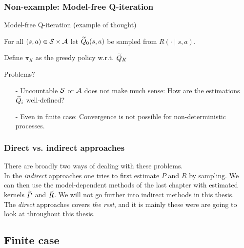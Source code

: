 \documentclass{beamer}[10]
\begin{document}
\begin{frame}[fragile]
  \frametitle{Non-example: Model-free Q-iteration}
  \begingroup
  \scriptsize
  \begin{block}{Model-free Q-iteration (example of thought)}
    \begin{algorithm}[H]
      For all $(s, a) \in \mathcal{S} \times \mathcal{A}$ let
      $\widetilde{Q}_0(s, a)$ be sampled from $R(\cdot \mid s, a)$.

      Define $\pi_K$ as the greedy policy w.r.t. $\widetilde{Q}_K$ \\
    \end{algorithm}
  \end{block}
  Problems?
  \begin{itemize}
    \item[-] Uncountable $\mathcal{S}$ or $\mathcal{A}$ does not make much sense:
      How are the estimations $\widetilde{Q}_i$ well-defined?
    \item[-] Even in finite case: Convergence is not possible for
      non-deterministic processes.
  \end{itemize}
  \endgroup
\end{frame}

\begin{frame}
  \frametitle{Direct vs. indirect approaches}
  There are broadly two ways of dealing with these
  problems.
  \\ In the \emph{indirect} approaches one tries to first estimate $P$ and $R$
  by sampling.
  We can then use the model-dependent methods of the last chapter with
  estimated kernels $\widetilde{P}$ and $\widetilde{R}$.
  We will not go further into indirect methods in this thesis.
  \\ The \emph{direct} approaches covers \emph{the rest},
  and it is mainly these were are going to look at throughout this
  thesis.
\end{frame}

\subsection{Finite case}
\end{document}
